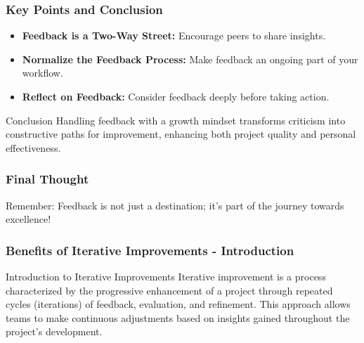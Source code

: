 \documentclass{beamer}
\begin{document}
\begin{frame}[fragile]
    \frametitle{Key Points and Conclusion}
    \begin{itemize}
        \item \textbf{Feedback is a Two-Way Street:} Encourage peers to share insights.
        \item \textbf{Normalize the Feedback Process:} Make feedback an ongoing part of your workflow.
        \item \textbf{Reflect on Feedback:} Consider feedback deeply before taking action.
    \end{itemize}

    \begin{block}{Conclusion}
        Handling feedback with a growth mindset transforms criticism into constructive paths for improvement, enhancing both project quality and personal effectiveness.
    \end{block}
\end{frame}

\begin{frame}[fragile]
    \frametitle{Final Thought}
    \begin{block}{Remember:}
        Feedback is not just a destination; it’s part of the journey towards excellence!
    \end{block}
\end{frame}

\begin{frame}[fragile]
    \frametitle{Benefits of Iterative Improvements - Introduction}
    \begin{block}{Introduction to Iterative Improvements}
        Iterative improvement is a process characterized by the progressive enhancement of a project through repeated cycles (iterations) of feedback, evaluation, and refinement. This approach allows teams to make continuous adjustments based on insights gained throughout the project's development.
    \end{block}
\end{frame}
\end{document}
